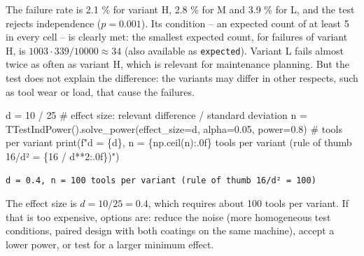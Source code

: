\documentclass[
  letterpaper,
  DIV=11,
  numbers=noendperiod]{scrreprt}
\newenvironment{Shaded}{\begin{snugshade}}{\end{snugshade}}
\newcommand{\BuiltInTok}[1]{\textcolor[rgb]{0.00,0.23,0.31}{#1}}
\newcommand{\CommentTok}[1]{\textcolor[rgb]{0.37,0.37,0.37}{#1}}
\newcommand{\DecValTok}[1]{\textcolor[rgb]{0.68,0.00,0.00}{#1}}
\newcommand{\FloatTok}[1]{\textcolor[rgb]{0.68,0.00,0.00}{#1}}
\newcommand{\NormalTok}[1]{\textcolor[rgb]{0.00,0.23,0.31}{#1}}
\newcommand{\OperatorTok}[1]{\textcolor[rgb]{0.37,0.37,0.37}{#1}}
\newcommand{\SpecialCharTok}[1]{\textcolor[rgb]{0.37,0.37,0.37}{#1}}
\newcommand{\SpecialStringTok}[1]{\textcolor[rgb]{0.13,0.47,0.30}{#1}}
\begin{document}
\begin{tcolorbox}
The failure rate is 2.1 \% for variant H, 2.8 \% for M and 3.9 \% for L,
and the test rejects independence (\(p = 0.001\)). Its condition -- an
expected count of at least 5 in every cell -- is clearly met: the
smallest expected count, for failures of variant H, is
\(1003 \cdot 339 / 10000 \approx 34\) (also available as
\texttt{expected}). Variant L fails almost twice as often as variant H,
which is relevant for maintenance planning. But the test does not
explain the difference: the variants may differ in other respects, such
as tool wear or load, that cause the failures.

\end{tcolorbox}

\begin{tcolorbox}[enhanced jigsaw, left=2mm, title=\textcolor{quarto-callout-caution-color}{\faFire}\hspace{0.5em}{Solution to Exercise 6}, opacityback=0, breakable, rightrule=.15mm, arc=.35mm, toptitle=1mm, colbacktitle=quarto-callout-caution-color!10!white, opacitybacktitle=0.6, coltitle=black, colframe=quarto-callout-caution-color-frame, bottomrule=.15mm, leftrule=.75mm, bottomtitle=1mm, titlerule=0mm, toprule=.15mm, colback=white]

\begin{Shaded}
\begin{Highlighting}[]
\NormalTok{d }\OperatorTok{=} \DecValTok{10} \OperatorTok{/} \DecValTok{25}                                     \CommentTok{\# effect size: relevant difference / standard deviation}
\NormalTok{n }\OperatorTok{=}\NormalTok{ TTestIndPower().solve\_power(effect\_size}\OperatorTok{=}\NormalTok{d, alpha}\OperatorTok{=}\FloatTok{0.05}\NormalTok{, power}\OperatorTok{=}\FloatTok{0.8}\NormalTok{)  }\CommentTok{\# tools per variant}
\BuiltInTok{print}\NormalTok{(}\SpecialStringTok{f"d = }\SpecialCharTok{\{}\NormalTok{d}\SpecialCharTok{\}}\SpecialStringTok{, n = }\SpecialCharTok{\{}\NormalTok{np}\SpecialCharTok{.}\NormalTok{ceil(n)}\SpecialCharTok{:.0f\}}\SpecialStringTok{ tools per variant (rule of thumb 16/d² = }\SpecialCharTok{\{}\DecValTok{16} \OperatorTok{/}\NormalTok{ d}\OperatorTok{**}\DecValTok{2}\SpecialCharTok{:.0f\}}\SpecialStringTok{)"}\NormalTok{)}
\end{Highlighting}
\end{Shaded}

\begin{verbatim}
d = 0.4, n = 100 tools per variant (rule of thumb 16/d² = 100)
\end{verbatim}

The effect size is \(d = 10/25 = 0.4\), which requires about 100 tools
per variant. If that is too expensive, options are: reduce the noise
(more homogeneous test conditions, paired design with both coatings on
the same machine), accept a lower power, or test for a larger minimum
effect.

\end{tcolorbox}
\end{document}
